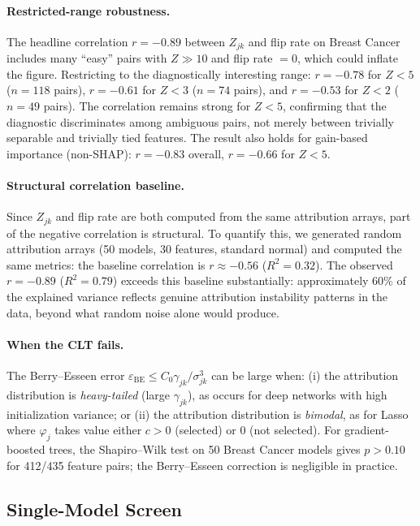 \documentclass{jmlr}
\begin{document}
\paragraph{Restricted-range robustness.}
The headline correlation $r = -0.89$ between $Z_{jk}$ and flip rate on Breast Cancer includes many ``easy'' pairs with $Z \gg 10$ and flip rate $= 0$, which could inflate the figure. Restricting to the diagnostically interesting range: $r = -0.78$ for $Z < 5$ ($n = 118$ pairs), $r = -0.61$ for $Z < 3$ ($n = 74$ pairs), and $r = -0.53$ for $Z < 2$ ($n = 49$ pairs). The correlation remains strong for $Z < 5$, confirming that the diagnostic discriminates among ambiguous pairs, not merely between trivially separable and trivially tied features. The result also holds for gain-based importance (non-SHAP): $r = -0.83$ overall, $r = -0.66$ for $Z < 5$.

\paragraph{Structural correlation baseline.}
Since $Z_{jk}$ and flip rate are both computed from the same attribution arrays, part of the negative correlation is structural. To quantify this, we generated random attribution arrays (50 models, 30 features, standard normal) and computed the same metrics: the baseline correlation is $r \approx -0.56$ ($R^2 = 0.32$). The observed $r = -0.89$ ($R^2 = 0.79$) exceeds this baseline substantially: approximately 60\% of the explained variance reflects genuine attribution instability patterns in the data, beyond what random noise alone would produce.

\paragraph{When the CLT fails.}
The Berry--Esseen error $\varepsilon_{\text{BE}} \leq C_0 \gamma_{jk}/\sigma_{jk}^3$ can be large when: (i) the attribution distribution is \emph{heavy-tailed} (large $\gamma_{jk}$), as occurs for deep networks with high initialization variance; or (ii) the attribution distribution is \emph{bimodal}, as for Lasso where $\varphi_j$ takes value either $c > 0$ (selected) or $0$ (not selected). For gradient-boosted trees, the Shapiro--Wilk test on 50 Breast Cancer models gives $p > 0.10$ for 412/435 feature pairs; the Berry--Esseen correction is negligible in practice.

\subsection{Single-Model Screen}
\label{sec:f5}
\end{document}
